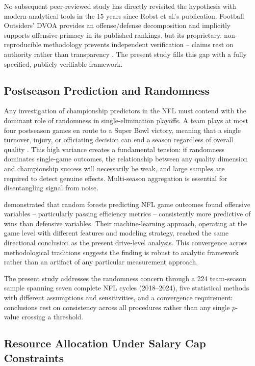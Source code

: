 \documentclass[12pt,a4paper]{article}
\begin{document}
No subsequent peer-reviewed study has directly revisited the hypothesis with modern analytical tools in the 15 years since Robst et al.'s publication. Football Outsiders' DVOA provides an offense/defense decomposition and implicitly supports offensive primacy in its published rankings, but its proprietary, non-reproducible methodology prevents independent verification -- claims rest on authority rather than transparency \citep{schatz2005dvoa}. The present study fills this gap with a fully specified, publicly verifiable framework.

\subsection{Postseason Prediction and Randomness}
\label{sec:prediction-randomness}

Any investigation of championship predictors in the NFL must contend with the dominant role of randomness in single-elimination playoffs. A team plays at most four postseason games en route to a Super Bowl victory, meaning that a single turnover, injury, or officiating decision can end a season regardless of overall quality \citep{lopez2018randomness}. This high variance creates a fundamental tension: if randomness dominates single-game outcomes, the relationship between any quality dimension and championship success will necessarily be weak, and large samples are required to detect genuine effects. Multi-season aggregation is essential for disentangling signal from noise.

\citet{lock2014randomforests} demonstrated that random forests predicting NFL game outcomes found offensive variables -- particularly passing efficiency metrics -- consistently more predictive of wins than defensive variables. Their machine-learning approach, operating at the game level with different features and modeling strategy, reached the same directional conclusion as the present drive-level analysis. This convergence across methodological traditions suggests the finding is robust to analytic framework rather than an artifact of any particular measurement approach.

The present study addresses the randomness concern through a 224 team-season sample spanning seven complete NFL cycles (2018--2024), five statistical methods with different assumptions and sensitivities, and a convergence requirement: conclusions rest on consistency across all procedures rather than any single $p$-value crossing a threshold.

\subsection{Resource Allocation Under Salary Cap Constraints}
\label{sec:resource-allocation-lit}
\end{document}
